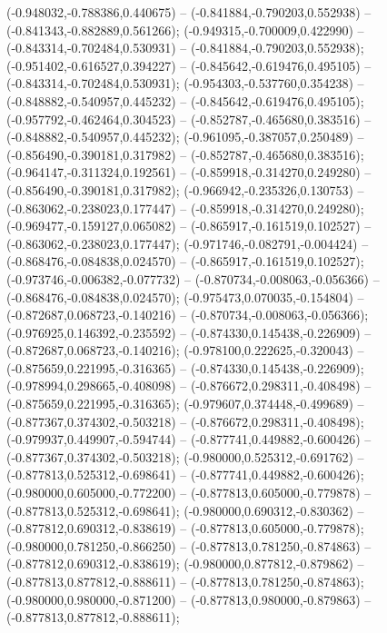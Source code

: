  (-0.948032,-0.788386,0.440675) -- (-0.841884,-0.790203,0.552938) -- (-0.841343,-0.882889,0.561266);
 (-0.949315,-0.700009,0.422990) -- (-0.843314,-0.702484,0.530931) -- (-0.841884,-0.790203,0.552938);
 (-0.951402,-0.616527,0.394227) -- (-0.845642,-0.619476,0.495105) -- (-0.843314,-0.702484,0.530931);
 (-0.954303,-0.537760,0.354238) -- (-0.848882,-0.540957,0.445232) -- (-0.845642,-0.619476,0.495105);
 (-0.957792,-0.462464,0.304523) -- (-0.852787,-0.465680,0.383516) -- (-0.848882,-0.540957,0.445232);
 (-0.961095,-0.387057,0.250489) -- (-0.856490,-0.390181,0.317982) -- (-0.852787,-0.465680,0.383516);
 (-0.964147,-0.311324,0.192561) -- (-0.859918,-0.314270,0.249280) -- (-0.856490,-0.390181,0.317982);
 (-0.966942,-0.235326,0.130753) -- (-0.863062,-0.238023,0.177447) -- (-0.859918,-0.314270,0.249280);
 (-0.969477,-0.159127,0.065082) -- (-0.865917,-0.161519,0.102527) -- (-0.863062,-0.238023,0.177447);
 (-0.971746,-0.082791,-0.004424) -- (-0.868476,-0.084838,0.024570) -- (-0.865917,-0.161519,0.102527);
 (-0.973746,-0.006382,-0.077732) -- (-0.870734,-0.008063,-0.056366) -- (-0.868476,-0.084838,0.024570);
 (-0.975473,0.070035,-0.154804) -- (-0.872687,0.068723,-0.140216) -- (-0.870734,-0.008063,-0.056366);
 (-0.976925,0.146392,-0.235592) -- (-0.874330,0.145438,-0.226909) -- (-0.872687,0.068723,-0.140216);
 (-0.978100,0.222625,-0.320043) -- (-0.875659,0.221995,-0.316365) -- (-0.874330,0.145438,-0.226909);
 (-0.978994,0.298665,-0.408098) -- (-0.876672,0.298311,-0.408498) -- (-0.875659,0.221995,-0.316365);
 (-0.979607,0.374448,-0.499689) -- (-0.877367,0.374302,-0.503218) -- (-0.876672,0.298311,-0.408498);
 (-0.979937,0.449907,-0.594744) -- (-0.877741,0.449882,-0.600426) -- (-0.877367,0.374302,-0.503218);
 (-0.980000,0.525312,-0.691762) -- (-0.877813,0.525312,-0.698641) -- (-0.877741,0.449882,-0.600426);
 (-0.980000,0.605000,-0.772200) -- (-0.877813,0.605000,-0.779878) -- (-0.877813,0.525312,-0.698641);
 (-0.980000,0.690312,-0.830362) -- (-0.877812,0.690312,-0.838619) -- (-0.877813,0.605000,-0.779878);
 (-0.980000,0.781250,-0.866250) -- (-0.877813,0.781250,-0.874863) -- (-0.877812,0.690312,-0.838619);
 (-0.980000,0.877812,-0.879862) -- (-0.877813,0.877812,-0.888611) -- (-0.877813,0.781250,-0.874863);
 (-0.980000,0.980000,-0.871200) -- (-0.877813,0.980000,-0.879863) -- (-0.877813,0.877812,-0.888611);
